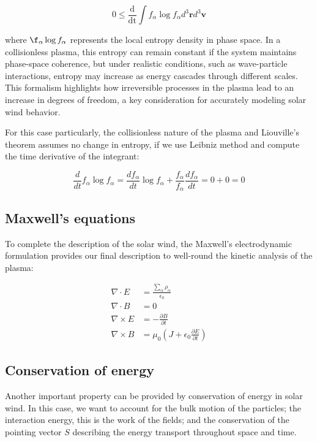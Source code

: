 \documentclass[12pt]{article}
\begin{document}
\begin{equation}
    0 \leq \frac{\mathrm{d}}{\mathrm{dt}} \int f_\alpha \log f_\alpha d^3\mathbf{r} d^3\mathbf{v}
\end{equation}

where $\f_\alpha \log f_\alpha$ represents the local entropy density in phase space. In a collisionless plasma, this entropy can remain constant if the system maintains phase-space coherence, but under realistic conditions, such as wave-particle interactions, entropy may increase as energy cascades through different scales. This formalism highlights how irreversible processes in the plasma lead to an increase in degrees of freedom, a key consideration for accurately modeling solar wind behavior.

For this case particularly, the collisionless nature of the plasma and Liouville's theorem assumes no change in entropy, if we use Leibniz method and compute the time derivative of the integrant:

\begin{equation}
    \frac{d}{dt} f_\alpha \log f_\alpha = \frac{df_\alpha}{dt} \log f_\alpha + \frac{f_\alpha}{f_\alpha}\frac{df_\alpha}{dt} = 0 + 0 = 0
\end{equation}

\subsection{Maxwell's equations}

To complete the description of the solar wind, the Maxwell's electrodynamic formulation provides our final description to well-round the kinetic analysis of the plasma:

\begin{align*}
    \nabla \cdot E &= \frac{\sum_{\alpha} \rho_\alpha}{\epsilon_0} \\
    \nabla \cdot B &= 0 \\
    \nabla \times E &= - \frac{\partial B}{\partial t} \\
    \nabla \times B &= \mu_0 \left(J + \epsilon_0 \frac{\partial E}{\partial t}\right)
\end{align*}

\subsection{Conservation of energy}
Another important property can be provided by conservation of energy in solar wind. In this case, we want to account for the bulk motion of the particles; the interaction energy, this is the work of the fields; and the conservation of the pointing vector $S$ describing the energy transport throughout space and time.
\end{document}
